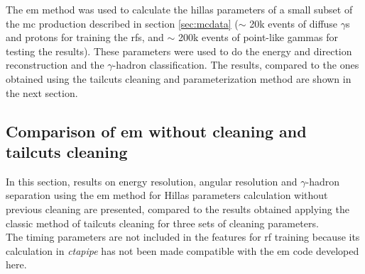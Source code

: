 \documentclass[main.tex]{subfiles}
\begin{document}
The \gls{em} method was used to calculate the hillas parameters of a small subset of the \gls{mc} production described in section \ref{sec:mcdata} ($\sim$ 20k events of diffuse $\gamma$s and protons for training the \gls{rf}s, and $\sim$ 200k events of point-like gammas for testing the results). These parameters were used to do the energy and direction reconstruction and the $\gamma$-hadron classification. The results, compared to the ones obtained using the tailcuts cleaning and parameterization method are shown in the next section.

\subsection{Comparison of \gls{em} without cleaning and tailcuts cleaning}

In this section, results on energy resolution, angular resolution and $\gamma$-hadron separation using the \gls{em} method for Hillas parameters calculation without previous cleaning are presented, compared to the results obtained applying the classic method of tailcuts cleaning for  three sets of cleaning parameters.\\
The timing parameters are not included in the features for \gls{rf} training because its calculation in \textit{ctapipe} has not been made compatible with the \gls{em} code developed here. 
\end{document}

